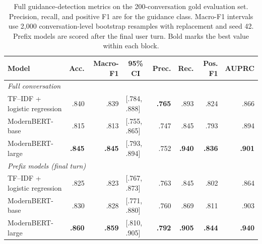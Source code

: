 \begin{table}[H]
\centering
\footnotesize
\setlength{\tabcolsep}{3.5pt}
\begin{tabular}{lrrlrrrr}
\toprule
Model & Acc. & Macro-F1 & \multicolumn{1}{c}{95\% CI} & Prec. & Rec. & Pos. F1 & AUPRC \\
\midrule
\multicolumn{8}{l}{\textit{Full conversation}} \\
\quad TF--IDF + logistic regression & .840 & .839 & [.784, .888] & \textbf{.765} & .893 & .824 & .866 \\
\quad ModernBERT-base & .815 & .813 & [.755, .865] & .747 & .845 & .793 & .894 \\
\quad ModernBERT-large & \textbf{.845} & \textbf{.845} & [.793, .894] & .752 & \textbf{.940} & \textbf{.836} & \textbf{.901} \\
\midrule
\multicolumn{8}{l}{\textit{Prefix models (final turn)}} \\
\quad TF--IDF + logistic regression & .825 & .823 & [.767, .873] & .763 & .845 & .802 & .864 \\
\quad ModernBERT-base & .830 & .828 & [.771, .880] & .760 & .869 & .811 & .903 \\
\quad ModernBERT-large & \textbf{.860} & \textbf{.859} & [.810, .905] & \textbf{.792} & \textbf{.905} & \textbf{.844} & \textbf{.940} \\
\bottomrule
\end{tabular}
\caption{Full guidance-detection metrics on the 200-conversation gold evaluation set. Precision, recall, and positive F1 are for the guidance class. Macro-F1 intervals use 2,000 conversation-level bootstrap resamples with replacement and seed 42. Prefix models are scored after the final user turn. Bold marks the best value within each block.}
\label{tab:supp-gold-guidance}
\end{table}